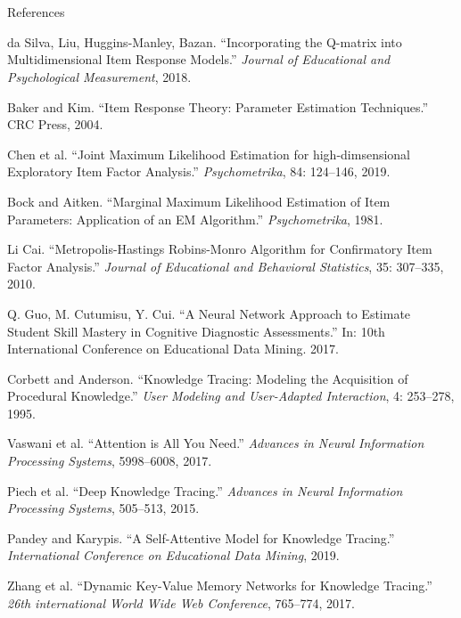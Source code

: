 \documentclass{beamer}
\theoremstyle{definition}
\begin{document}
\section{}
\begin{frame}{References}
\begin{thebibliography}{20}
\tiny


 da Silva, Liu, Huggins-Manley, Bazan. ``Incorporating the Q-matrix into Multidimensional Item Response Models.'' \textit{Journal of Educational and Psychological Measurement}, 2018.

 Baker and Kim. ``Item Response Theory: Parameter Estimation Techniques.'' CRC Press, 2004.

 Chen et al. ``Joint Maximum Likelihood Estimation for high-dimsensional Exploratory Item Factor Analysis.'' \textit{Psychometrika}, 84: 124--146, 2019.

 Bock and Aitken. ``Marginal Maximum Likelihood Estimation of Item Parameters: Application of an EM Algorithm.'' \textit{Psychometrika}, 1981.

 Li Cai. ``Metropolis-Hastings Robins-Monro Algorithm for Confirmatory Item Factor Analysis.'' \textit{Journal of Educational and Behavioral Statistics}, 35: 307--335, 2010.

 Q. Guo, M. Cutumisu, Y. Cui. ``A Neural Network Approach to Estimate Student Skill Mastery in Cognitive Diagnostic Assessments.'' In: 10th International Conference on Educational Data Mining. 2017.

 Corbett and Anderson. ``Knowledge Tracing: Modeling the Acquisition of Procedural Knowledge.'' \textit{User Modeling and User-Adapted Interaction}, 4: 253--278, 1995.

 Vaswani et al. ``Attention is All You Need.'' \textit{Advances in Neural Information Processing Systems}, 5998--6008, 2017.

 Piech et al. ``Deep Knowledge Tracing.'' \textit{Advances in Neural Information Processing Systems}, 505--513, 2015.

 Pandey and Karypis. ``A Self-Attentive Model for Knowledge Tracing.'' \textit{International Conference on Educational Data Mining}, 2019.

 Zhang et al. ``Dynamic Key-Value Memory Networks for Knowledge Tracing.'' \textit{26th international World Wide Web Conference}, 765--774, 2017.

\end{thebibliography}
\end{frame}
\end{document}
